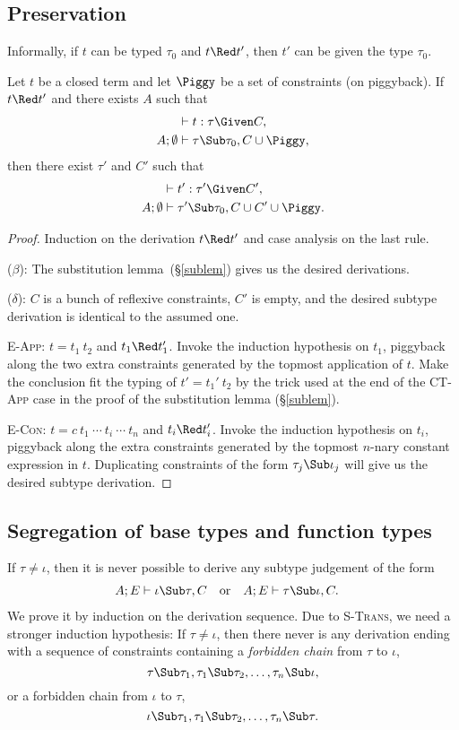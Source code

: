 \documentclass{amsart}
\theoremstyle{definition}
\begin{document}
\subsection{Preservation}

Informally, if $t$ can be typed $\tau_0$ and $t\Red t'$,
then $t'$ can be given the type $\tau_0$.

Let $t$ be a closed term and let $\Piggy$ be a set of constraints
(on piggyback). If $t\Red t'$ and there exists $A$ such that
\begin{align*}
&\vdash t:\tau \Given C,\\
A;\emptyset&\vdash \tau\Sub\tau_0,C\cup\Piggy,
\end{align*}
then there exist $\tau'$ and $C'$ such that
\begin{align*}
&\vdash t':\tau'\Given C',\\
A;\emptyset&\vdash \tau'\Sub\tau_0,C\cup C'\cup\Piggy.
\end{align*}

\begin{proof}
Induction on the derivation $t\Red t'$ and case analysis on the
last rule.

\Case($\beta$): The substitution lemma~(\S\ref{sublem}) gives us
the desired derivations.

\Case($\delta$): $C$ is a bunch of reflexive constraints, $C'$ is
empty, and the desired subtype derivation is identical to the
assumed one.

\Case\textsc{E-App}: $t=t_1~t_2$ and $t_1\Red t_1'$. Invoke the
induction hypothesis on $t_1$, piggyback along the two extra
constraints generated by the topmost application of $t$. Make
the conclusion fit the typing of $t'=t_1'~t_2$ by the trick used
at the end of the \textsc{CT-App} case in the proof of the
substitution lemma (\S\ref{sublem}).

\Case\textsc{E-Con}: $t=c~t_1~\cdots~t_i~\cdots~t_n$ and $t_i\Red
t_i'$. Invoke the induction hypothesis on $t_i$, piggyback along
the extra constraints generated by the topmost $n$-nary constant
expression in $t$. Duplicating constraints of the form
$\tau_j\Sub\iota_j$ will give us the desired subtype derivation.
\end{proof}

\subsection{Segregation of base types and function types}
\label{segre-types}
If $\tau\neq\iota$, then it is never possible to derive any
subtype judgement of the form
\begin{align*}
A;E&\vdash \iota\Sub\tau,C&
&\mbox{or}&
A;E&\vdash\tau\Sub\iota,C.
\end{align*}
We prove it by induction on the derivation sequence. Due to
\textsc{S-Trans}, we need a stronger induction hypothesis: If
$\tau\neq\iota$, then there never is any derivation ending with a
sequence of constraints containing a \emph{forbidden chain} from
$\tau$ to $\iota$,
\[
\tau\Sub\tau_1,\tau_1\Sub\tau_2,\ldots,\tau_n\Sub\iota,
\]
or a forbidden chain from $\iota$ to $\tau$,
\[
\iota\Sub\tau_1,\tau_1\Sub\tau_2,\ldots,\tau_n\Sub\tau.
\]
\end{document}
